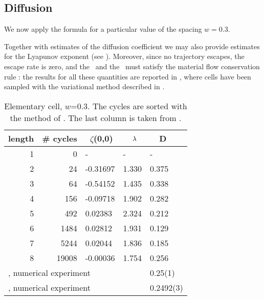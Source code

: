 {\subsection{Diffusion}

We now apply the formula  for a particular value of the spacing
$w=0.3$.

Together with estimates of the diffusion coefficient we may also
provide estimates for the Lyapunov exponent (see ).
Moreover,
since no trajectory escapes, the escape rate is zero, and the
\Fd\ and the \dzeta\ must satisfy the material flow conservation rule
: the results for all these quantities are reported in
,
where cells have been sampled with the variational method described
in .
%
\begin{table}
\caption[]{\small
Elementary cell, $w$=0.3.
The cycles are sorted with the
method of .
The last column is taken from .
}
{\small
\begin{tabular}{rrlll}
\hline
length & \# cycles & ~$\zeta$(0,0) & ~~$\lambda$ & ~~D \\ \hline
1      & 0      &   -    &   -  &   - \\
2      & 24     & -0.31697 & 1.330 & 0.375 \\
3      & 64     & -0.54152 & 1.435 & 0.338 \\
4      & 156    & -0.09718 & 1.902 & 0.282 \\
5      & 492    &  0.02383 & 2.324 & 0.212 \\
6      & 1484   &  0.02812 & 1.931 & 0.129 \\
7      & 5244   &  0.02044 & 1.836 & 0.185 \\
8      & 19008  & -0.00036 & 1.754 & 0.256 \\ \hline
\multicolumn{4}{l}{{MZ}, numerical experiment} & 0.25(1) \\
\multicolumn{4}{l}{{MR94}, numerical experiment} & 0.2492(3)
\end{tabular}
}  %
\label{t-diff-3}
\end{table}
%

}
